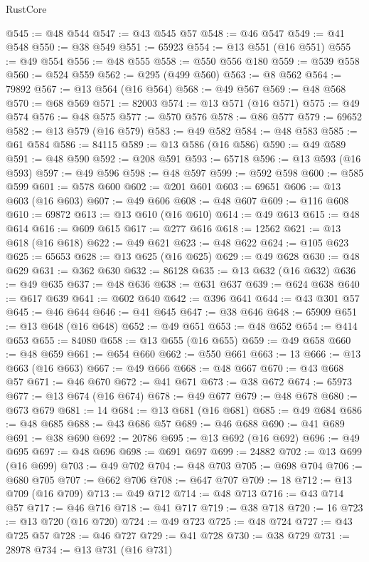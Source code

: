 \begin{lexlean}{RustCore}
\begin{coremodule}
@545 := @48 @544
@547 := @43 @545 @57
@548 := @46 @547
@549 := @41 @548
@550 := @38 @549
@551 := 65923
@554 := @13 @551 (@16 @551)
@555 := @49 @554
@556 := @48 @555
@558 := @550 @556 @180
@559 := @539 @558
@560 := @524 @559
@562 := @295 (@499 @560)
@563 := @8 @562
@564 := 79892
@567 := @13 @564 (@16 @564)
@568 := @49 @567
@569 := @48 @568
@570 := @68 @569
@571 := 82003
@574 := @13 @571 (@16 @571)
@575 := @49 @574
@576 := @48 @575
@577 := @570 @576
@578 := @86 @577
@579 := 69652
@582 := @13 @579 (@16 @579)
@583 := @49 @582
@584 := @48 @583
@585 := @61 @584
@586 := 84115
@589 := @13 @586 (@16 @586)
@590 := @49 @589
@591 := @48 @590
@592 := @208 @591
@593 := 65718
@596 := @13 @593 (@16 @593)
@597 := @49 @596
@598 := @48 @597
@599 := @592 @598
@600 := @585 @599
@601 := @578 @600
@602 := @201 @601
@603 := 69651
@606 := @13 @603 (@16 @603)
@607 := @49 @606
@608 := @48 @607
@609 := @116 @608
@610 := 69872
@613 := @13 @610 (@16 @610)
@614 := @49 @613
@615 := @48 @614
@616 := @609 @615
@617 := @277 @616
@618 := 12562
@621 := @13 @618 (@16 @618)
@622 := @49 @621
@623 := @48 @622
@624 := @105 @623
@625 := 65653
@628 := @13 @625 (@16 @625)
@629 := @49 @628
@630 := @48 @629
@631 := @362 @630
@632 := 86128
@635 := @13 @632 (@16 @632)
@636 := @49 @635
@637 := @48 @636
@638 := @631 @637
@639 := @624 @638
@640 := @617 @639
@641 := @602 @640
@642 := @396 @641
@644 := @43 @301 @57
@645 := @46 @644
@646 := @41 @645
@647 := @38 @646
@648 := 65909
@651 := @13 @648 (@16 @648)
@652 := @49 @651
@653 := @48 @652
@654 := @414 @653
@655 := 84080
@658 := @13 @655 (@16 @655)
@659 := @49 @658
@660 := @48 @659
@661 := @654 @660
@662 := @550 @661
@663 := 13
@666 := @13 @663 (@16 @663)
@667 := @49 @666
@668 := @48 @667
@670 := @43 @668 @57
@671 := @46 @670
@672 := @41 @671
@673 := @38 @672
@674 := 65973
@677 := @13 @674 (@16 @674)
@678 := @49 @677
@679 := @48 @678
@680 := @673 @679
@681 := 14
@684 := @13 @681 (@16 @681)
@685 := @49 @684
@686 := @48 @685
@688 := @43 @686 @57
@689 := @46 @688
@690 := @41 @689
@691 := @38 @690
@692 := 20786
@695 := @13 @692 (@16 @692)
@696 := @49 @695
@697 := @48 @696
@698 := @691 @697
@699 := 24882
@702 := @13 @699 (@16 @699)
@703 := @49 @702
@704 := @48 @703
@705 := @698 @704
@706 := @680 @705
@707 := @662 @706
@708 := @647 @707
@709 := 18
@712 := @13 @709 (@16 @709)
@713 := @49 @712
@714 := @48 @713
@716 := @43 @714 @57
@717 := @46 @716
@718 := @41 @717
@719 := @38 @718
@720 := 16
@723 := @13 @720 (@16 @720)
@724 := @49 @723
@725 := @48 @724
@727 := @43 @725 @57
@728 := @46 @727
@729 := @41 @728
@730 := @38 @729
@731 := 28978
@734 := @13 @731 (@16 @731)

\end{coremodule}
\end{lexlean}
